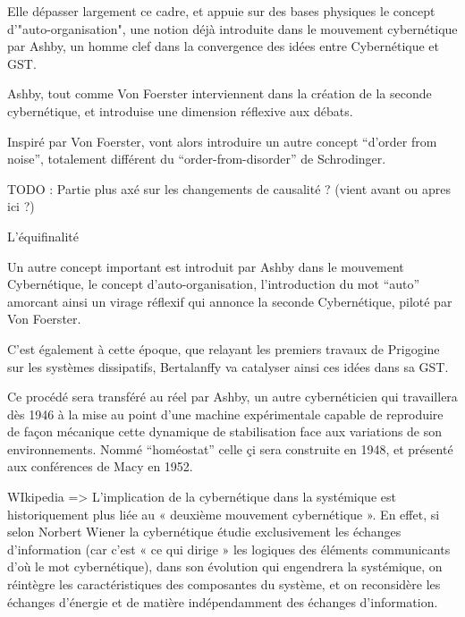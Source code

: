Elle dépasser largement ce cadre, et appuie sur des bases physiques le concept d'"auto-organisation", une notion déjà introduite dans le mouvement cybernétique par Ashby, un homme clef dans la convergence des idées entre Cybernétique et GST.

Ashby, tout comme Von Foerster interviennent dans la création de la seconde cybernétique, et introduise une dimension réflexive aux débats.

Inspiré par Von Foerster, vont alors introduire un autre concept \enquote{d'order from noise}, totalement différent du \enquote{order-from-disorder} de Schrodinger.

TODO : Partie plus axé sur les changements de causalité ? (vient avant ou apres ici ?)

L'équifinalité 

Un autre concept important est introduit par Ashby dans le mouvement Cybernétique, le concept d'auto-organisation, l'introduction du mot \enquote{auto} amorcant ainsi un virage réflexif qui annonce la seconde Cybernétique, piloté par Von Foerster.




C'est également à cette époque, que relayant les premiers travaux de Prigogine sur les systèmes dissipatifs, Bertalanffy va catalyser ainsi ces idées dans sa GST.

Ce procédé sera transféré au réel par Ashby, un autre cybernéticien qui travaillera dès 1946 à la mise au point d'une machine expérimentale capable de reproduire de façon mécanique cette dynamique de stabilisation face aux variations de son environnements. Nommé \enquote{homéostat} celle çi sera construite en 1948, et présenté aux conférences de Macy en 1952.

WIkipedia => L'implication de la cybernétique dans la systémique est historiquement plus liée au « deuxième mouvement cybernétique ». En effet, si selon Norbert Wiener la cybernétique étudie exclusivement les échanges d'information (car c'est « ce qui dirige » les logiques des éléments communicants d'où le mot cybernétique), dans son évolution qui engendrera la systémique, on réintègre les caractéristiques des composantes du système, et on reconsidère les échanges d'énergie et de matière indépendamment des échanges d'information.

